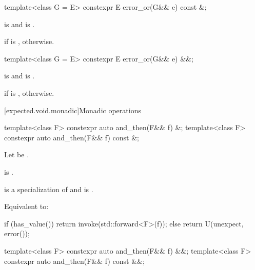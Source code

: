 %
\begin{itemdecl}
template<class G = E> constexpr E error_or(G&& e) const &;
\end{itemdecl}

\begin{itemdescr}
\pnum
\mandates
{} is  and
 is .

\pnum
\returns
{} if  is ,
 otherwise.
\end{itemdescr}

%
\begin{itemdecl}
template<class G = E> constexpr E error_or(G&& e) &&;
\end{itemdecl}

\begin{itemdescr}
\pnum
\mandates
{} is  and
 is .

\pnum
\returns
{} if  is ,
 otherwise.
\end{itemdescr}

[expected.void.monadic]{Monadic operations}

%
\begin{itemdecl}
template<class F> constexpr auto and_then(F&& f) &;
template<class F> constexpr auto and_then(F&& f) const &;
\end{itemdecl}

\begin{itemdescr}
\pnum
Let  be .

\pnum
\constraints
{} is .

\pnum
\mandates
{} is a specialization of  and
 is .

\pnum
\effects
Equivalent to:
\begin{codeblock}
if (has_value())
  return invoke(std::forward<F>(f));
else
  return U(unexpect, error());
\end{codeblock}
\end{itemdescr}

%
\begin{itemdecl}
template<class F> constexpr auto and_then(F&& f) &&;
template<class F> constexpr auto and_then(F&& f) const &&;
\end{itemdecl}


